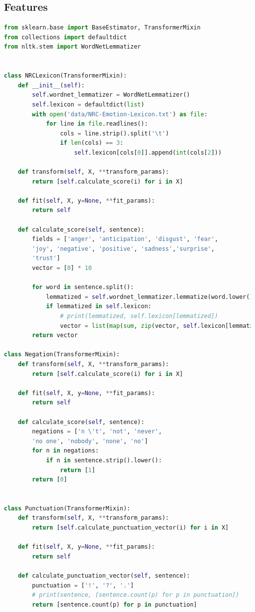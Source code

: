 \documentclass[
10pt, %
a4paper, %
oneside, %
headinclude,footinclude, %
BCOR5mm, %
]{scrartcl}
\begin{document}
\subsection{Features}
\begin{lstlisting}[language=Python]
from sklearn.base import BaseEstimator, TransformerMixin
from collections import defaultdict
from nltk.stem import WordNetLemmatizer


class NRCLexicon(TransformerMixin):
    def __init__(self):
        self.wordnet_lemmatizer = WordNetLemmatizer()
        self.lexicon = defaultdict(list)
        with open('data/NRC-Emotion-Lexicon.txt') as file:
            for line in file.readlines():
                cols = line.strip().split('\t')
                if len(cols) == 3:
                    self.lexicon[cols[0]].append(int(cols[2]))

    def transform(self, X, **transform_params):
        return [self.calculate_score(i) for i in X]

    def fit(self, X, y=None, **fit_params):
        return self

    def calculate_score(self, sentence):
        fields = ['anger', 'anticipation', 'disgust', 'fear',
        'joy', 'negative', 'positive', 'sadness','surprise',
        'trust']
        vector = [0] * 10

        for word in sentence.split():
            lemmatized = self.wordnet_lemmatizer.lemmatize(word.lower())
            if lemmatized in self.lexicon:
                # print(lemmatized, self.lexicon[lemmatized])
                vector = list(map(sum, zip(vector, self.lexicon[lemmatized])))
        return vector

class Negation(TransformerMixin):
    def transform(self, X, **transform_params):
        return [self.calculate_score(i) for i in X]

    def fit(self, X, y=None, **fit_params):
        return self

    def calculate_score(self, sentence):
        negations = ['n \'t', 'not', 'never', 
        'no one', 'nobody', 'none', 'no']
        for n in negations:
            if n in sentence.strip().lower():
                return [1]
        return [0]


class Punctuation(TransformerMixin):
    def transform(self, X, **transform_params):
        return [self.calculate_punctuation_vector(i) for i in X]

    def fit(self, X, y=None, **fit_params):
        return self

    def calculate_punctuation_vector(self, sentence):
        punctuation = ['!', '?', '.']
        # print(sentence, [sentence.count(p) for p in punctuation])
        return [sentence.count(p) for p in punctuation]
\end{lstlisting}
\end{document}
